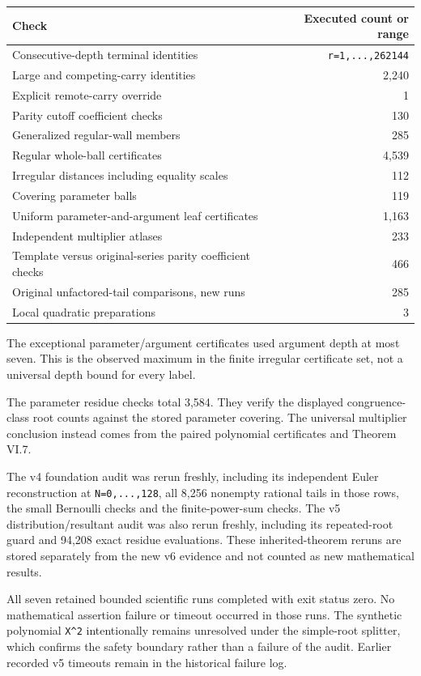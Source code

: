 \documentclass[11pt,letterpaper]{article}
\begin{document}
\begin{longtable}[]{@{}lr@{}}
\toprule\noalign{}
Check & Executed count or range \\
\midrule\noalign{}
\endhead
\bottomrule\noalign{}
\endlastfoot
Consecutive-depth terminal identities & \texttt{r=1,...,262144} \\
Large and competing-carry identities & 2,240 \\
Explicit remote-carry override & 1 \\
Parity cutoff coefficient checks & 130 \\
Generalized regular-wall members & 285 \\
Regular whole-ball certificates & 4,539 \\
Irregular distances including equality scales & 112 \\
Covering parameter balls & 119 \\
Uniform parameter-and-argument leaf certificates & 1,163 \\
Independent multiplier atlases & 233 \\
Template versus original-series parity coefficient checks & 466 \\
Original unfactored-tail comparisons, new runs & 285 \\
Local quadratic preparations & 3 \\
\end{longtable}

The exceptional parameter/argument certificates used argument depth at most seven. This is the observed maximum in the finite irregular certificate set, not a universal depth bound for every label.

The parameter residue checks total 3,584. They verify the displayed congruence-class root counts against the stored parameter covering. The universal multiplier conclusion instead comes from the paired polynomial certificates and Theorem VI.7.

The v4 foundation audit was rerun freshly, including its independent Euler reconstruction at \texttt{N=0,...,128}, all 8,256 nonempty rational tails in those rows, the small Bernoulli checks and the finite-power-sum checks. The v5 distribution/resultant audit was also rerun freshly, including its repeated-root guard and 94,208 exact residue evaluations. These inherited-theorem reruns are stored separately from the new v6 evidence and not counted as new mathematical results.

All seven retained bounded scientific runs completed with exit status zero. No mathematical assertion failure or timeout occurred in those runs. The synthetic polynomial \texttt{X\^{}2} intentionally remains unresolved under the simple-root splitter, which confirms the safety boundary rather than a failure of the audit. Earlier recorded v5 timeouts remain in the historical failure log.
\end{document}
